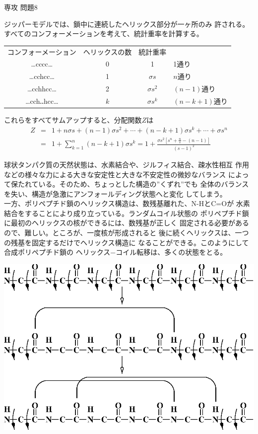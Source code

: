 \documentclass[fleqn]{jbook}
\begin{document}
\begin{answer}{専攻 問題8}{}
\begin{subanswers}
\SubAnswer
  ジッパーモデルでは、鎖中に連続したヘリックス部分が一ヶ所のみ
  許される。すべてのコンフォーメーションを考えて、統計重率を計算する。
%
  \begin{center}
  \begin{tabular}{cccl}
  コンフォーメーション &ヘリックスの数&統計重率    &     \\
  …cccc…             &   0          &  1         &1通り\\
  …cchcc…            &   1          &$\sigma s$  &$n$通り\\
  …cchhcc…           &   2          &$\sigma s^2$&$(n-1)$通り\\
  …cch‥hcc…         &  $ k $       &$\sigma s^k$&$(n-k+1)$通り
  \end{tabular}
  \end{center}
%
  これらをすべてサムアップすると、分配関数$Z$は
%
  \begin{eqnarray*}  
    Z &=& 1 + n \sigma s + (n-1)\sigma s^2%
        + \cdots +(n-k+1)\sigma s^k + \cdots + \sigma s^n \\
      &=& 1 + \sum_{k=1}^n (n-k+1)\sigma s^k%
       =  1 + \frac{\sigma s^2 [s^n + \frac{n}{s} - (n-1)]}{(s-1)^2}
  \end{eqnarray*} 

\SubAnswer
  球状タンパク質の天然状態は、水素結合や、ジルフィス結合、疎水性相互
  作用などの様々な力による大きな安定性と大きな不安定性の微妙なバランス
  によって保たれている。そのため、ちょっとした構造の''くずれ''でも
  全体のバランスを失い、構造が急激にアンフォールディング状態へと変化
  してしまう。\\
  一方、ポリペプチド鎖のヘリックス構造は、数残基離れた、N-HとC=Oが
  水素結合をすることにより成り立っている。ランダムコイル状態の
  ポリペプチド鎖に最初のヘリックスの核ができるには、数残基が正しく
  固定される必要があるので、難しい。ところが、一度核が形成されると
  後に続くヘリックスは、一つの残基を固定するだけでヘリックス構造に
  なることができる。このようにして合成ポリペプチド鎖の
  ヘリックス−コイル転移は、多くの状態をとる。

\begin{center}
  \mbox{\includegraphics[clip]{1995phy8-2.eps}}
\end{center}


\end{subanswers}
\end{answer}
\end{document}
